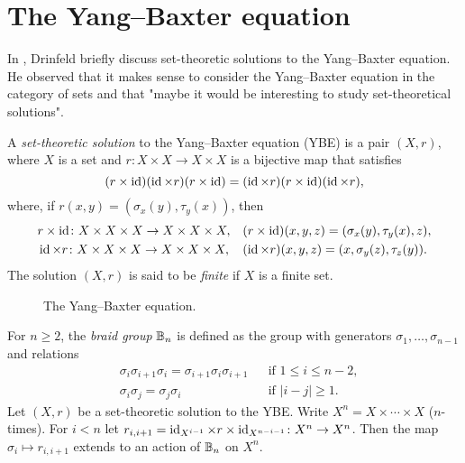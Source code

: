 \chapter{The Yang--Baxter equation}

In \cite{MR1183474}, Drinfeld briefly discuss set-theoretic solutions to the Yang--Baxter equation. 
He observed that
it makes sense to consider the Yang--Baxter equation in the category of sets and that 
"maybe it would be interesting to study set-theoretical solutions". 

\begin{definition}
A \emph{set-theoretic solution} to the Yang--Baxter equation (YBE) is a pair $(X,r)$, 
where $X$ is a set and $r\colon X\times X\to X\times X$ is a bijective map that satisfies 
\[
(r\times\operatorname{id})(\operatorname{id}\times r)(r\times\operatorname{id})=
(\operatorname{id}\times r)(r\times\operatorname{id})(\operatorname{id}\times r),
\]
where, if $r(x,y)=(\sigma_x(y),\tau_y(x))$, then 
\begin{align*}
& r\times\operatorname{id}\colon X\times X\times X\to X\times X\times X, &&(r\times\operatorname{id})(x,y,z)=(\sigma_x(y),\tau_y(x),z),\\
& \operatorname{id}\times r\colon X\times X\times X\to X\times X\times X, &&(\operatorname{id}\times r)(x,y,z)=(x,\sigma_y(z),\tau_z(y)).
\end{align*}
The solution $(X,r)$ is said to be \emph{finite} if $X$ is a finite set. 
\end{definition}

\begin{figure}
\centering
{}
\hspace{1cm}
\caption{The Yang--Baxter equation.}
\label{fig:braid}
\end{figure}

For $n\geq2$, the \emph{braid group} $\mathbb{B}_n$ is defined as the group with generators $\sigma_1,\dots,\sigma_{n-1}$ and relations
\begin{align*}
    &\sigma_i\sigma_{i+1}\sigma_i=\sigma_{i+1}\sigma_i\sigma_{i+1} && \text{if }1\leq i\leq n-2,\\
    &\sigma_i\sigma_j=\sigma_j\sigma_i && \text{if }|i-j|\geq 1.
\end{align*}
Let $(X,r)$ be a set-theoretic solution to the YBE. Write $X^n=X\times\cdots\times X$ ($n$-times).  
For $i<n$ let $r_{i,i+1}=\operatorname{id}_{X^{i-1}}\times r\times\operatorname{id}_{X^{n-i-1}}\colon X^n\to X^n$. Then the map $\sigma_i\mapsto r_{i,i+1}$ extends 
to an action of $\mathbb{B}_n$ on $X^n$.

